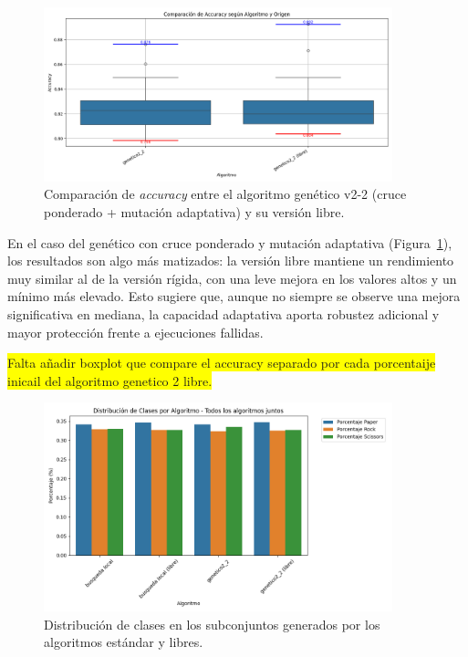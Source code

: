 \begin{figure}[htp]
    \centering
    \includegraphics[width=0.9\textwidth]{imagenes/evaluaciones/libres/comparacion_gen_v2}
    \caption{Comparación de \textit{accuracy} entre el algoritmo genético v2-2 (cruce ponderado + mutación adaptativa) y su versión libre.}
    \label{fig:gen_v2_libre}
\end{figure}

En el caso del genético con cruce ponderado y mutación adaptativa (Figura~\ref{fig:gen_v2_libre}),
los resultados son algo más matizados: la versión libre mantiene un rendimiento muy similar al de la versión rígida,
con una leve mejora en los valores altos y un mínimo más elevado.
Esto sugiere que, aunque no siempre se observe una mejora significativa en mediana,
la capacidad adaptativa aporta robustez adicional y mayor protección frente a ejecuciones fallidas.


\colorbox{yellow}{Falta añadir boxplot que compare el accuracy separado por cada porcentaije inicail del algoritmo genetico 2 libre.}


\begin{figure}[htp]
    \centering
    \includegraphics[width=0.9\textwidth]{imagenes/evaluaciones/libres/distribucion-clases}
    \caption{Distribución de clases en los subconjuntos generados por los algoritmos estándar y libres.}
    \label{fig:distribucion_libres}
\end{figure}

